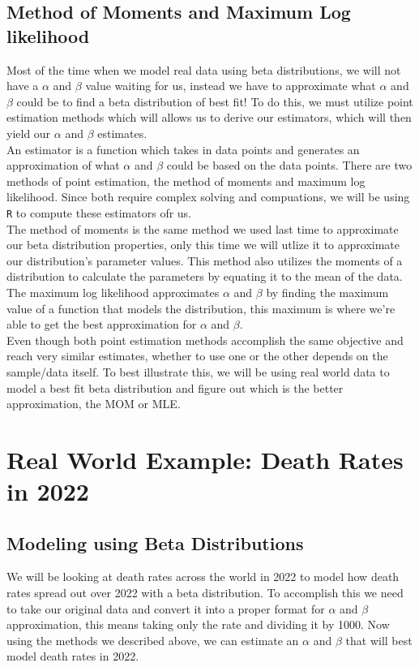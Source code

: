 \documentclass{article}\usepackage[]{graphicx}\usepackage[]{xcolor}
\begin{document}
\begin{multicols}{2}
\subsection{Method of Moments and Maximum Log likelihood}
Most of the time when we model real data using beta distributions, we will not have a $\alpha$ and $\beta$ value waiting for us, instead we have to approximate what $\alpha$ and $\beta$ could be to find a beta distribution of best fit! To do this, we must utilize point estimation methods which will allows us to derive our estimators, which will then yield our $\alpha$ and $\beta$ estimates. \\
An estimator is a function which takes in data points and generates an approximation of what $\alpha$ and $\beta$ could be based on the data points. There are two methods of point estimation, the method of moments and maximum log likelihood. Since both require complex solving and compuations, we will be using \texttt{R} to compute these estimators ofr us. \\
The method of moments is the same method we used last time to approximate our beta distribution properties, only this time we will utlize it to approximate our distribution's parameter values. This method also utilizes the moments of a distribution to calculate the parameters by equating it to the mean of the data. \\
The maximum log likelihood approximates $\alpha$ and $\beta$ by finding the maximum value of a function that models the distribution, this maximum is where we're able to get the best approximation for $\alpha$ and $\beta$. \\
Even though both point estimation methods accomplish the same objective and reach very similar estimates, whether to use one or the other depends on the sample/data itself. To best illustrate this, we will be using real world data to model a best fit beta distribution and figure out which is the better approximation, the MOM or MLE.

\section{Real World Example: Death Rates in 2022}
\subsection{Modeling using Beta Distributions}
We will be looking at death rates across the world in 2022 \citep{WorldBankData} to model how death rates spread out over 2022 with a beta distribution. To accomplish this we need to take our original data and convert it into a proper format for $\alpha$ and $\beta$ approximation, this means taking only the rate and dividing it by 1000. Now using the methods we described above, we can estimate an $\alpha$ and $\beta$ that will best model death rates in 2022. \\


\end{multicols}
\end{document}
